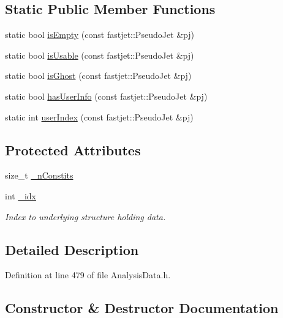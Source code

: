 \subsection*{Static Public Member Functions}
\begin{DoxyCompactItemize}
\item 
static bool \hyperlink{classAnalysis_1_1FastJet_1_1UserInfo_a79ba59c5af9a4bc2e641ab2e54e8d50b}{is\+Empty} (const fastjet\+::\+Pseudo\+Jet \&pj)
\item 
static bool \hyperlink{classAnalysis_1_1FastJet_1_1UserInfo_a18b23aae344587ff280a046e70af1d29}{is\+Usable} (const fastjet\+::\+Pseudo\+Jet \&pj)
\item 
static bool \hyperlink{classAnalysis_1_1FastJet_1_1UserInfo_a4682fdc7e258328293b05951f55cc7a1}{is\+Ghost} (const fastjet\+::\+Pseudo\+Jet \&pj)
\item 
static bool \hyperlink{classAnalysis_1_1FastJet_1_1UserInfo_a681f1076b15320ea55e7104b4fe01c3a}{has\+User\+Info} (const fastjet\+::\+Pseudo\+Jet \&pj)
\item 
static int \hyperlink{classAnalysis_1_1FastJet_1_1UserInfo_a767f93f891d045f209198cdf72fddf36}{user\+Index} (const fastjet\+::\+Pseudo\+Jet \&pj)
\end{DoxyCompactItemize}
\subsection*{Protected Attributes}
\begin{DoxyCompactItemize}
\item 
size\+\_\+t \hyperlink{classAnalysis_1_1FastJet_1_1TruthJetInfo_aba7d046daedfd7f63bcca2b85ff448aa}{\+\_\+n\+Constits}
\item 
int \hyperlink{classAnalysis_1_1FastJet_1_1UserInfo_ad9aa33e317aea2b675493b664cc718a3}{\+\_\+idx}
\begin{DoxyCompactList}\small\item\em Index to underlying structure holding data. \end{DoxyCompactList}\end{DoxyCompactItemize}


\subsection{Detailed Description}


Definition at line 479 of file Analysis\+Data.\+h.



\subsection{Constructor \& Destructor Documentation}
